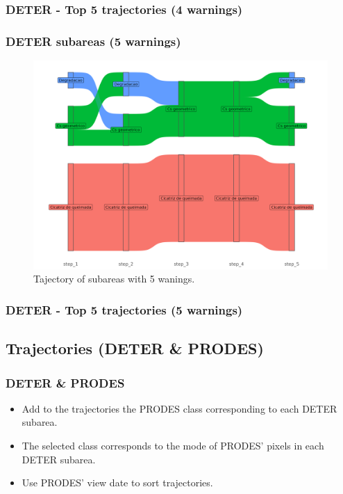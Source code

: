 \documentclass[aspectratio=169]{beamer}
\begin{document}
\begin{frame}[allowframebreaks]
    \frametitle{DETER - Top 5 trajectories (4 warnings)}
    
\end{frame}

\begin{frame}
    \frametitle{DETER subareas (5 warnings)}
    \begin{figure}[h] 
        \includegraphics[width=0.65\linewidth]
        {./figures/plot_deter_subarea_trajectory_5.png}
        \caption{Tajectory of subareas with 5 wanings.}
        \label{fig:deter_subarea_trajectory_5}
    \end{figure}
\end{frame}

\begin{frame}[allowframebreaks]
    \frametitle{DETER - Top 5 trajectories (5 warnings)}
    
\end{frame}



\subsection{Trajectories (DETER \& PRODES)} 

\begin{frame}
    \frametitle{DETER \& PRODES}
    \begin{itemize}
        \item Add to the trajectories the PRODES class corresponding to each
            DETER subarea.
        \item The selected class corresponds to the mode of PRODES' pixels in
            each DETER subarea.
        \item Use PRODES' view date to sort trajectories.
    \end{itemize}
\end{frame}
\end{document}
